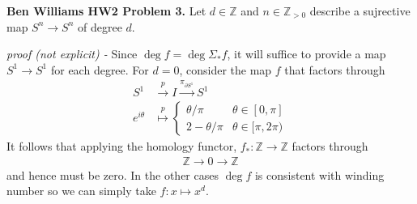 \documentclass[11pt]{article}
\theoremstyle{definition}
\begin{document}

    \textbf{Ben Williams HW2 Problem 3.} Let \(d \in \mathbb{Z}\) and \(n \in \mathbb{Z}_{>0}\) describe a sujrective map \(S^n \to S^n\) of degree \(d\).

    \emph{proof (not explicit) - } Since \(\deg f = \deg \Sigma_* f\), it will suffice to provide a map \(S^1 \to S^1\) for each degree. For \(d = 0\), consider
    the map \(f\) that factors through
    \begin{align*}
        S^1 &\overset{p}{\to} I \overset{\pi_{\partial S^1}}{\to} S^1 \\
        e^{i\theta} &\overset{p}{\mapsto} \begin{cases} \theta/\pi & \theta \in [0,\pi] \\
                                                        2 - \theta/\pi & \theta \in [\pi,2\pi) \end{cases}
    \end{align*}
    It follows that applying the homology functor, \(f_*: \mathbb{Z} \to \mathbb{Z}\) factors through
    \begin{align*}
        \mathbb{Z} \to 0 \to \mathbb{Z}
    \end{align*}
    and hence must be zero. In the other cases \(\deg f\) is consistent with winding number so we can simply take \(f: x \mapsto x^d\).
\end{document}
